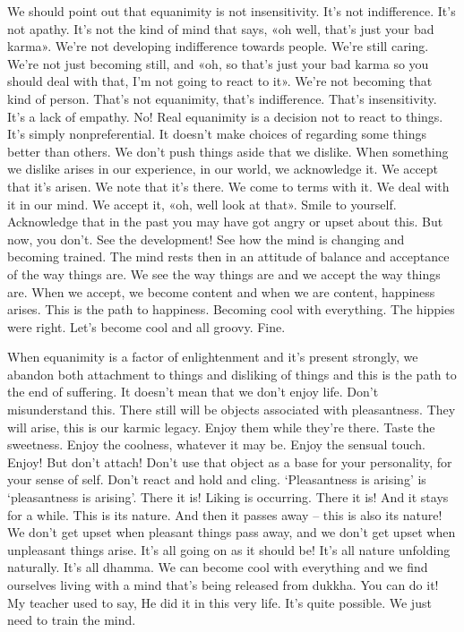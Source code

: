 \documentclass[letterpaper,10pt,english]{sphinxmanual}
\begin{document}
\sphinxAtStartPar
We should point out that equanimity is not insensitivity. It’s not indifference. It’s not apathy. It’s not the kind of mind that says, «oh well, that’s
just  your  bad  karma».  We’re  not  developing  indifference  towards  people.
We’re still caring. We’re not just becoming still, and «oh, so that’s just your
bad karma so you should deal with that, I’m not going to react to it». We’re
not becoming that kind of person. That’s not equanimity, that’s indifference.
That’s insensitivity. It’s a lack of empathy. No! Real equanimity is a decision
not to react to things. It’s simply non\sphinxhyphen{}preferential. It doesn’t make choices of
regarding some things better than others. We don’t push things aside that we
dislike. When something we dislike arises in our experience, in our world,
we  acknowledge  it. We  accept  that  it’s  arisen. We  note  that  it’s  there. We
come to terms with it. We deal with it in our mind. We accept it, «oh, well
look at that». Smile to yourself. Acknowledge that in the past you may have
got angry or upset about this. But now, you don’t. See the development! See
how the mind is changing and becoming trained. The mind rests then in an
  attitude  of  balance  and  acceptance  of  the  way  things  are. We  see  the  way
things are and we accept the way things are. When we accept, we become
content and when we are content, happiness arises. This is the path to happiness. Becoming cool with everything. The hippies were right. Let’s become
cool and all groovy. Fine.

\sphinxAtStartPar
When equanimity is a factor of enlightenment and it’s present strongly,
we abandon both attachment to things and disliking of things and this is the
path to the end of suffering. It doesn’t mean that we don’t enjoy life. Don’t
misunderstand this. There still will be objects associated with pleasantness.
They will arise, this is our karmic legacy. Enjoy them while they’re there.
Taste the sweetness. Enjoy the coolness, whatever it may be. Enjoy the sensual touch. Enjoy! But don’t attach! Don’t use that object as a base for your
personality, for your sense of self. Don’t react and hold and cling. ‘Pleasantness is arising’ is ‘pleasantness is arising’. There it is! Liking is occurring.
There it  is! And it stays for a while. This is its nature. And  then  it passes
away – this is also its nature! We don’t get upset when pleasant things pass
away, and we don’t get upset when unpleasant things arise. It’s all going on
as it should be! It’s all nature unfolding naturally. It’s all dhamma. We can
become cool with everything and we find ourselves living with a mind that’s
being released from dukkha. You can do it! My teacher used to say,
He did it in this very life. It’s quite possible. We just
need to train the mind.
\end{document}

